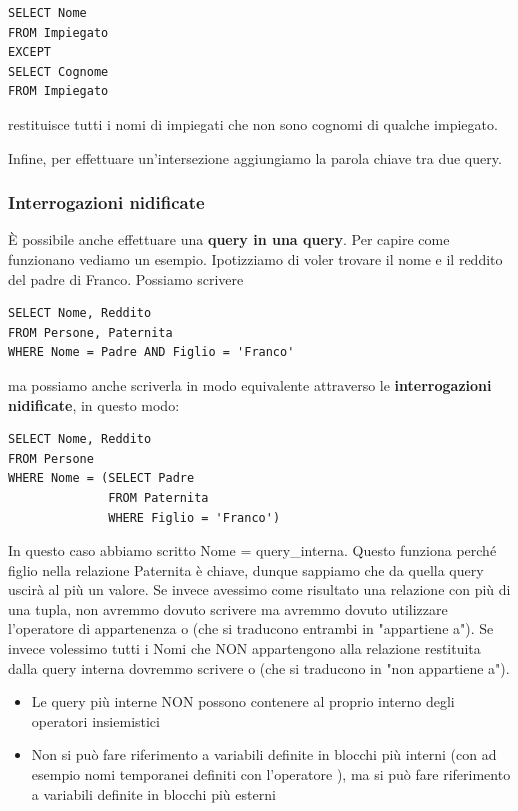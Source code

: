 \documentclass[11pt, a4paper, titlepage, oneside]{scrbook}
\begin{document}
\begin{lstlisting}
SELECT Nome
FROM Impiegato
EXCEPT
SELECT Cognome
FROM Impiegato
\end{lstlisting}

restituisce tutti i nomi di impiegati che non sono cognomi di qualche impiegato.

Infine, per effettuare un'intersezione aggiungiamo la parola chiave  tra due query. 

\subsubsection*{Interrogazioni nidificate}

È possibile anche effettuare una \textbf{query in una query}. Per capire come funzionano vediamo un esempio. Ipotizziamo di voler trovare il nome e il reddito del padre di Franco. Possiamo scrivere

\begin{lstlisting}
SELECT Nome, Reddito
FROM Persone, Paternita
WHERE Nome = Padre AND Figlio = 'Franco'
\end{lstlisting}

ma possiamo anche scriverla in modo equivalente attraverso le \textbf{interrogazioni nidificate}, in questo modo:

\begin{lstlisting}
SELECT Nome, Reddito
FROM Persone
WHERE Nome = (SELECT Padre
              FROM Paternita
              WHERE Figlio = 'Franco')
\end{lstlisting}    

In questo caso abbiamo scritto Nome = query\_interna. Questo funziona perché figlio nella relazione Paternita è chiave, dunque sappiamo che da quella query uscirà al più un valore. Se invece avessimo come risultato una relazione con più di una tupla, non avremmo dovuto scrivere \code{=} ma avremmo dovuto utilizzare l'operatore di appartenenza  o  (che si traducono entrambi in "appartiene a"). Se invece volessimo tutti i Nomi che NON appartengono alla relazione restituita dalla query interna dovremmo scrivere  o  (che si traducono in "non appartiene a").

\begin{Proprieta}
\label{prop-regole-interr-nd}
\begin{itemize}
    \item Le query più interne NON possono contenere al proprio interno degli operatori insiemistici
    \item Non si può fare riferimento a variabili definite in blocchi più interni (con ad esempio nomi temporanei definiti con l'operatore ), ma si può fare riferimento a variabili definite in blocchi più esterni
\end{itemize}
\end{Proprieta} 
\end{document}
